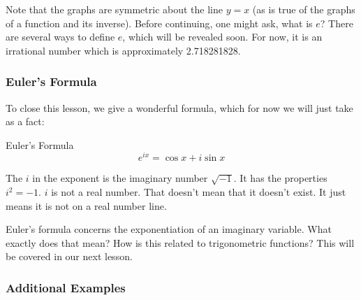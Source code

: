 \documentclass[twoside,openright,titlepage,a4paper]{book}
\begin{document}
\begin{sloppypar}
Note that the graphs are symmetric about the line ${y = x}$ (as is true of the graphs of a function and its inverse).
Before continuing, one might ask, what is $e$? There are several ways to define $e$, which will be revealed soon. For now, it is an irrational number which is approximately 2.718281828.

\subsubsection{Euler's Formula}
To close this lesson, we give a wonderful formula, which for now we will just take as a fact:\\
\begin{examplebox}
Euler's Formula
\begin{equation*} e^{ix}=\cos x+i\sin x \end{equation*}
\end{examplebox}

The $i$ in the exponent is the imaginary number ${\sqrt{-1}}$. It has the properties ${i^{2}=-1}$. $i$ is not a real number. That doesn't mean that it doesn't exist. It just means it is not on a real number line.

Euler's formula concerns the exponentiation of an imaginary variable. What exactly does that mean? How is this related to trigonometric functions? This will be covered in our next lesson.

\subsubsection{Additional Examples}


\end{sloppypar}
\end{document}
